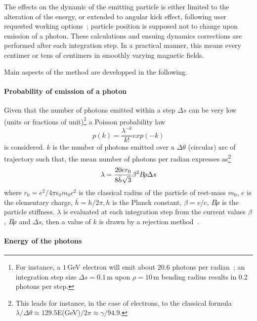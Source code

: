 The effects on the dynamic of the emitting particle 
 is either limited to the alteration of the energy, or extended to angular kick effect, 
following user requested working options~; particle 
position is supposed not to  change upon emission of a photon. These calculations 
 and ensuing dynamics corrections are performed after 
 each integration step. In a practical manner, this 
means every centimer or tens of centimers in smoothly varying magnetic fields. 

Main aspects of the method are developped in the following. 

\paragraph{Probability of emission of a photon}

Given that the number of photons emitted within a step $\Delta s$ can be very low (units or fractions 
of unit)\footnote{For instance, a $1\,$GeV electron will emit about $20.6$ photons per radian~; an 
 integration step size $\Delta s =0.1\,$m upon $\rho=10\,$m bending radius results in 0.2 photons 
per step.} a Poisson probability law 
\begin{equation}
	\label{EqPoiss}
 p(k) = \frac{\lambda^{-k}}{k!} exp(-k)
\end{equation}
is considered. $k$ is the number of photons emitted over a $\Delta \theta$ (circular) arc of 
trajectory  such that, the mean number of photons per radian expresses as\footnote{This leads for 
instance, in the case of electrons, to the classical formula $\lambda/\Delta \theta \approx
129.5$E(GeV)$/2\pi\approx \gamma/94.9$.}
\begin{equation}
        \label{EqPoissMean}
 \lambda = \frac{20 e r_0 }{8 \bar{h} \sqrt{3}  } \beta^2 B\!\rho  \Delta s
\end{equation}
where $r_0=e^2/4\pi \epsilon_0 m_0 c^2$ is the classical radius of the particle of rest-mass $m_0$, 
$e$ is the elementary 
charge, $\bar{h} = h/2\pi , h$ is the Planck constant, $\beta = v/c$, $B\!\rho$ is the particle 
stiffness. $\lambda$ is evaluated at each integration step from the current values $\beta$, $B\!\rho$ 
and $\Delta s$,  then a value of $k$ is drawn by a rejection method~\cite[routine POIDEV]{NumRec}.  


\paragraph{Energy of the photons}

